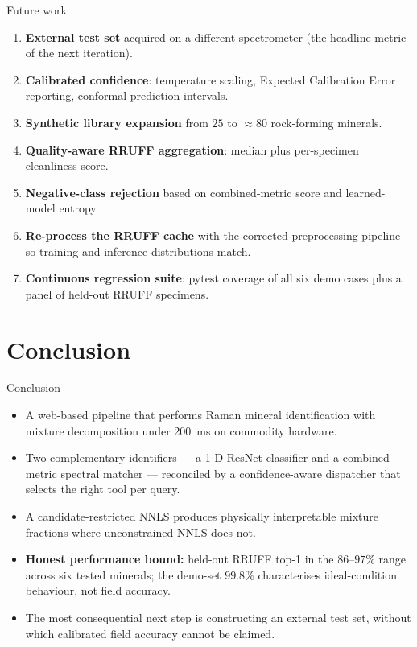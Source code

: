 \documentclass[10pt,aspectratio=169,xcolor=dvipsnames]{beamer}
\begin{document}
\begin{frame}{Future work}
  \begin{enumerate}\setlength\itemsep{0.30em}
    \item \textbf{External test set} acquired on a different spectrometer
          (the headline metric of the next iteration).
    \item \textbf{Calibrated confidence}: temperature scaling, Expected
          Calibration Error reporting, conformal-prediction intervals.
    \item \textbf{Synthetic library expansion} from $25$ to $\approx 80$
          rock-forming minerals.
    \item \textbf{Quality-aware RRUFF aggregation}: median plus
          per-specimen cleanliness score.
    \item \textbf{Negative-class rejection} based on combined-metric score
          and learned-model entropy.
    \item \textbf{Re-process the RRUFF cache} with the corrected preprocessing
          pipeline so training and inference distributions match.
    \item \textbf{Continuous regression suite}: pytest coverage of all six
          demo cases plus a panel of held-out RRUFF specimens.
  \end{enumerate}
\end{frame}

\section{Conclusion}

\begin{frame}{Conclusion}
  \begin{itemize}\setlength\itemsep{0.40em}
    \item A web-based pipeline that performs Raman mineral identification
          with mixture decomposition under \SI{200}{\milli\second} on
          commodity hardware.
    \item Two complementary identifiers --- a 1-D ResNet classifier
          and a combined-metric spectral matcher --- reconciled by a
          confidence-aware dispatcher that selects the right tool per
          query.
    \item A candidate-restricted NNLS produces physically interpretable
          mixture fractions where unconstrained NNLS does not.
    \item \textbf{Honest performance bound:} held-out RRUFF top-1 in the
          $86$–$97\%$ range across six tested minerals; the demo-set
          $99.8\%$ characterises ideal-condition behaviour, not field
          accuracy.
    \item The most consequential next step is constructing an external
          test set, without which calibrated field accuracy cannot be claimed.
  \end{itemize}
\end{frame}
\end{document}
